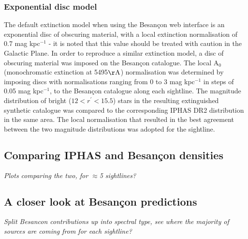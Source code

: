 \documentclass[a4paper,useAMS,usenatbib]{mn2e}
\begin{document}
\subsubsection{Exponential disc model}
The default extinction model when using the Besan\c{c}on web interface is an exponential disc of obscuring material, with a local extinction normalisation of 0.7 mag kpc$^{-1}$ - it is noted that this value should be treated with caution in the Galactic Plane. In order to reproduce a similar extinction model, a disc of obscuring material was imposed on the Besan\c{c}on catalogue. The local A$_0$ (monochromatic extinction at 5495$\mathrm{\AA}$) normalisation was determined by imposing discs with normalisations ranging from 0 to 3 mag kpc$^{-1}$ in steps of 0.05 mag kpc$^{-1}$, to the Besan\c{c}on catalogue along each sightline. The magnitude distribution of bright ($12<r^{\prime}<15.5$) stars in the resulting extinguished synthetic catalogue was compared to the corresponding IPHAS DR2 distribution in the same area. The local normalisation that resulted in the best agreement between the two magnitude distributions was adopted for the sightline.

\subsection{Comparing IPHAS and Besan\c{c}on densities}
\textit{Plots comparing the two, for $\approx$5 sightlines?}

\subsection{A closer look at Besan\c{c}on predictions}
\textit{Split Besancon contributions up into spectral type, see where the majority of sources are coming from for each sightline?}

\end{document}
